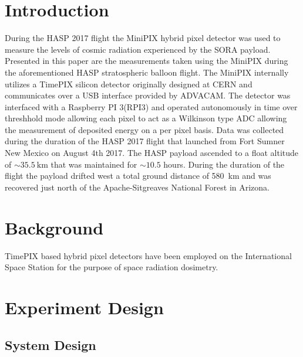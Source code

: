 \documentclass[final,1p, times, twocolumn]{elsarticle}
\begin{document}
\linenumbers

\section{Introduction}
\label{Introduction}
During the HASP 2017\cite{hasp} flight the MiniPIX hybrid pixel detector\cite{minipix} was used to measure the levels of cosmic radiation experienced by the SORA payload\cite{sora}. Presented in this paper are the measurements taken using the MiniPIX during the aforementioned HASP stratospheric balloon flight. The MiniPIX internally utilizes a TimePIX silicon detector originally designed at CERN\cite{cern} and communicates over a USB interface provided by ADVACAM\cite{advacam}. The detector was interfaced with a Raspberry PI 3(RPI3) and operated autonomously in time over threshhold mode allowing each pixel to act as a Wilkinson type ADC allowing the measurement of deposited energy on a per pixel basis. Data was collected during the duration of the HASP 2017 flight that launched from Fort Sumner New Mexico on August 4th 2017. The HASP payload ascended to a float altitude of $\sim{}\SI{35.5}{\kilo\meter}$ that was maintained for $\sim{}10.5$ hours. During the duration of the flight the payload drifted west a total ground distance of \SI{580}{\kilo\meter} and was recovered just north of the Apache-Sitgreaves National Forest in Arizona.


\section{Background}
\label{Background}
TimePIX based hybrid pixel detectors have been employed on the International Space Station for the purpose of space radiation dosimetry.

\section{Experiment Design}
\label{Experiment Design}

\subsection{System Design}
\end{document}
